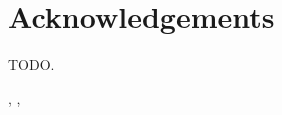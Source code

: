 \thispagestyle{plain}			%
\section*{Acknowledgements}
TODO.

\hfill
\thesisAuthor, \thesisCity, \thesisMonth\ \thesisYear

\if{}
\newpage				%
\thispagestyle{empty}
\mbox{}
\fi
